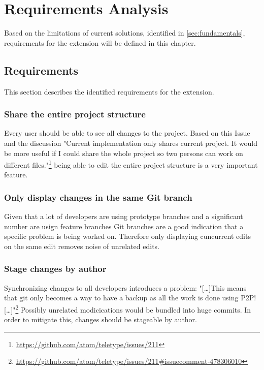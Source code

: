 \chapter{Requirements Analysis}

Based on the limitations of current solutions, identified in \autoref{sec:fundamentals}, requirements for the extension will be defined in this chapter.

\section{Requirements}

This section describes the identified requirements for the extension.

\subsection{Share the entire project structure}

Every user should be able to see all changes to the project.
Based on this Issue and the discussion "Current implementation only shares current project. It would be more useful if I could share the whole project so two persons can work on different files."\footnote{\href{https://github.com/atom/teletype/issues/211}{https://github.com/atom/teletype/issues/211}} being able to edit the entire project structure is a very important feature.

\subsection{Only display changes in the same Git branch}

Given that a lot of developers are using prototype branches and a significant number are usign feature branches Git branches are a good indication that a specific problem is being worked on.\cite{PhillipsSillitoWalker:2011:Branching_and_merging} Therefore only displaying cuncurrent edits on the same edit removes noise of unrelated edits.

\subsection{Stage changes by author}

Synchronizing changes to all developers introduces a problem:
"[\dots]This means that git only becomes a way to have a backup as all the work is done using P2P! [\dots]"\footnote{\href{https://github.com/atom/teletype/issues/211\#issuecomment-478306010}{https://github.com/atom/teletype/issues/211\#issuecomment-478306010}}
Possibly unrelated modicications would be bundled into huge commits. In order to mitigate this, changes should be stageable by author.


